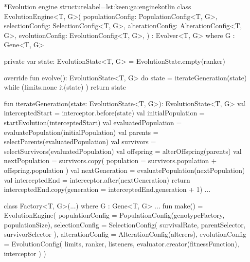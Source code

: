     \begin{code}*{Evolution engine structure}{label={lst:keen:ga:engine}}{kotlin}
        class EvolutionEngine<T, G>(
            populationConfig: PopulationConfig<T, G>,
            selectionConfig: SelectionConfig<T, G>,
            alterationConfig: AlterationConfig<T, G>,
            evolutionConfig: EvolutionConfig<T, G>,
        ) : Evolver<T, G> where G : Gene<T, G> {
        
            private var state: EvolutionState<T, G> = EvolutionState.empty(ranker)
        
            override fun evolve(): EvolutionState<T, G> {
                do {
                    state = iterateGeneration(state)
                } while (limits.none { it(state) })
                return state
            }
        
            fun iterateGeneration(state: EvolutionState<T, G>): EvolutionState<T, G> {
                val interceptedStart = interceptor.before(state)
                val initialPopulation = startEvolution(interceptedStart)
                val evaluatedPopulation = evaluatePopulation(initialPopulation)
                val parents = selectParents(evaluatedPopulation)
                val survivors = selectSurvivors(evaluatedPopulation)
                val offspring = alterOffspring(parents)
                val nextPopulation = survivors.copy(
                    population = survivors.population + offspring.population
                )
                val nextGeneration = evaluatePopulation(nextPopulation)
                val interceptedEnd = interceptor.after(nextGeneration)
                return interceptedEnd.copy(generation = interceptedEnd.generation + 1)
            }
            ...

            class Factory<T, G>(...) where G : Gene<T, G> {
                ...
                fun make() = EvolutionEngine(
                    populationConfig = PopulationConfig(genotypeFactory, populationSize),
                    selectionConfig = SelectionConfig(
                        survivalRate, parentSelector, survivorSelector
                    ),
                    alterationConfig = AlterationConfig(alterers),
                    evolutionConfig = EvolutionConfig(
                        limits, ranker, listeners, evaluator.creator(fitnessFunction), interceptor
                    )
                )
            }
        }
    
    \end{code}

